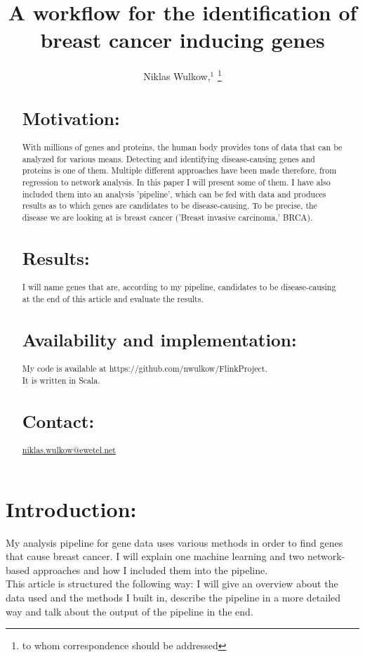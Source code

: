\documentclass{bioinfo}
\begin{document}

\title[]{A workflow for the identification of breast cancer inducing genes}
\author[Niklas Wulkow]{Niklas Wulkow,$^{1}$
\footnote{to whom correspondence should be addressed}}
\address{$^{1}$Freie Universit{\"a}t Berlin}

\history{}

\editor{}

\maketitle
\begin{abstract}

\section{Motivation:}
With millions of genes and proteins, the human body provides tons of data that can be analyzed for various means. Detecting and identifying disease-causing genes and proteins is one of them. Multiple different approaches have been made therefore, from regression to network analysis. In this paper I will present some of them. I have also included them into an analysis 'pipeline', which can be fed with data and produces results as to which genes are candidates to be disease-causing. To be precise, the disease we are looking at is breast cancer ('Breast invasive carcinoma,' BRCA).

\section{Results:}
I will name genes that are, according to my pipeline, candidates to be disease-causing at the end of this article and evaluate the results.

\section{Availability and implementation:}
My code is available at
https://github.com/nwulkow/FlinkProject.\\
It is written in Scala.

\section{Contact:} \href{}{niklas.wulkow@ewetel.net}
\end{abstract}

\section{Introduction:}
My analysis pipeline for gene data uses various methods in order to find genes that cause breast cancer. I will explain one machine learning and two network-based approaches and how I included them into the pipeline.\\
This article is structured the following way: I will give an overview about the data used and the methods I built in, describe the pipeline in a more detailed way and talk about the output of the pipeline in the end. 
\end{document}
